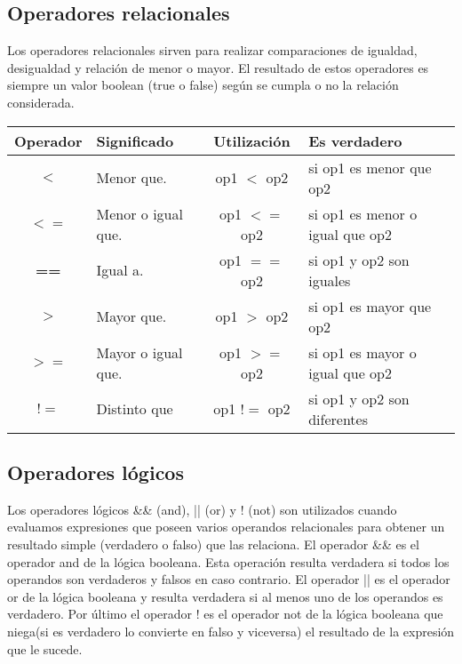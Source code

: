 \subsection{Operadores relacionales}
Los operadores relacionales sirven para
 realizar comparaciones de igualdad,
 desigualdad y relación de menor o mayor.
 El resultado de estos operadores es
siempre un valor boolean (true o false)
según se cumpla o no la relación
 considerada.

\begin{tabular}{|c|p{4cm}|c|p{6cm}|}
	\hline
	\textbf{Operador} & \textbf{Significado} & \textbf{Utilización} & \textbf{Es verdadero } \\ \hline
	\textbf{$<$} &  Menor que. & op1 $<$ op2 & si op1 es menor que op2 \\ \hline 
	\textbf{$<=$} & Menor o igual que. & op1 $<=$ op2 & si op1 es menor o igual que op2 \\ \hline 
	\textbf{==} &  Igual a. & op1 $==$ op2 & si op1 y op2 son iguales \\ \hline
	\textbf{$>$} &  Mayor que. & op1 $>$ op2 & si op1 es mayor que op2 \\ \hline
	\textbf{$>=$} & Mayor o igual que. & op1 $>=$ op2 & si op1 es mayor o igual que op2 \\ \hline
	\textbf{$!=$} & Distinto que & op1 $!=$ op2 & si op1 y op2 son diferentes \\ \hline
\end{tabular}

\subsection{Operadores lógicos}

Los operadores lógicos \&\& (and), || (or) y ! (not) son utilizados cuando evaluamos expresiones que poseen varios operandos relacionales para obtener un
resultado simple (verdadero o falso) que las relaciona. El operador \&\& es
el operador and de la lógica booleana. Esta operación resulta verdadera si
todos los operandos son verdaderos y falsos en caso contrario. El operador || es el operador or de la lógica booleana y resulta verdadera si
al menos uno de los operandos es verdadero. Por último el operador ! es el operador not de la lógica booleana que niega(si es verdadero lo convierte en falso y viceversa) el resultado de la expresión que le sucede.

